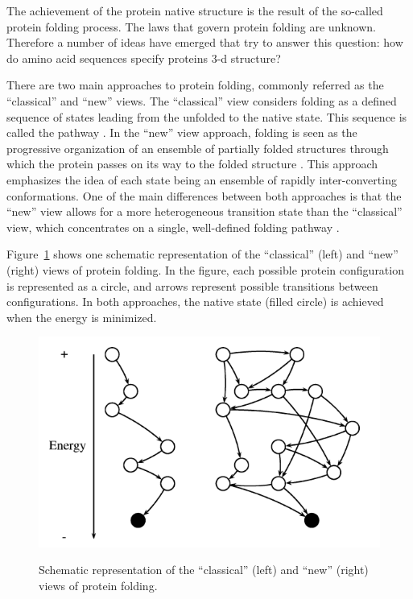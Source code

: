 The achievement of the protein native structure is the result of the so-called protein folding process. The laws that govern protein folding are unknown. Therefore a number of ideas have emerged that try to answer this question: how do amino acid sequences specify proteins 3-d structure?


There are two main approaches to protein folding, commonly referred as the ``classical'' and ``new'' views. The ``classical'' view considers folding as a defined sequence of states leading from the unfolded to the native state. This sequence is called the pathway \cite{pande:1998}. In the  ``new'' view approach, folding is seen as the progressive organization of an ensemble of partially folded structures through which the protein passes on its way to the folded structure \cite{onuchic:2004}. This approach emphasizes the idea of each state being an ensemble of rapidly inter-converting conformations. One of the main differences between both approaches is that the ``new'' view allows for a more heterogeneous transition state than the ``classical'' view, which concentrates on a single, well-defined folding pathway \cite{baker:2000}.


Figure~\ref{fig:protviews} shows one schematic representation of the ``classical'' (left) and  ``new'' (right) views of protein folding. In the figure, each possible protein configuration is represented as a circle, and arrows represent possible transitions between configurations. In both approaches, the native state (filled circle) is achieved when the energy is minimized.


\begin{figure}[htb!]
	\includegraphics[scale=.6]{figures/protviews.png}
	\label{fig:protviews}
	\caption{Schematic representation of the “classical” (left) and “new” (right)
		views of protein folding.}
\end{figure}


